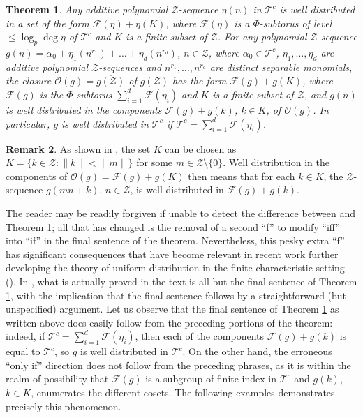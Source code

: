 \documentclass[11pt]{amsart}
\theoremstyle{theorem}
\newtheorem{theorem}{Theorem}[section]
\theoremstyle{definition}
\newtheorem{remark}[theorem]{Remark}
\newcommand{\mZ}{\mathcal{Z}}
\newcommand{\mT}{\mathcal{T}}
\newcommand{\mF}{\mathcal{F}}
\newcommand{\mO}{\mathcal{O}}
\begin{document}
\begin{theorem} \label{thm: corrected main}
	Any additive polynomial $\mZ$-sequence $\eta(n)$ in $\mT^c$ is well distributed in a set of the form $\mF(\eta) + \eta(K)$, where $\mF(\eta)$ is a $\Phi$-subtorus of level $\le \log_p \deg{\eta}$ of $\mT^c$ and $K$ is a finite subset of $\mZ$.
	For any polynomial $\mZ$-sequence $g(n) = \alpha_0 + \eta_1(n^{r_1}) + \ldots + \eta_d(n^{r_d})$, $n \in \mZ$, where $\alpha_0 \in \mT^c$, $\eta_1, \ldots, \eta_d$ are additive polynomial $\mZ$-sequences and $n^{r_1}, \ldots, n^{r_d}$ are distinct separable monomials, the closure $\mO(g) = \overline{g(\mZ)}$ of $g(\mZ)$ has the form $\mF(g) + g(K)$, where $\mF(g)$ is the $\Phi$-subtorus $\sum_{i=1}^d \mF(\eta_i)$ and $K$ is a finite subset of $\mZ$, and $g(n)$ is well distributed in the components $\mF(g) + g(k)$, $k \in K$, of $\mO(g)$.
	In particular, $g$ is well distributed in $\mT^c$ if $\mT^c = \sum_{i=1}^d \mF(\eta_i)$.
\end{theorem}

\begin{remark}
    As shown in \cite[Theorem 8.1]{bl}, the set $K$ can be chosen as $K = \{k \in \mZ : \|k\| < \|m\|\}$ for some $m \in \mZ \setminus \{0\}$.
    Well distribution in the components of $\mO(g) = \mF(g) + g(K)$ then means that for each $k \in K$, the $\mZ$-sequence $g(mn+k)$, $n \in \mZ$, is well distributed in $\mF(g)+g(k)$.
\end{remark}

The reader may be readily forgiven if unable to detect the difference between \cite[Theorem 0.3]{bl} and Theorem \ref{thm: corrected main}; all that has changed is the removal of a second ``f'' to modify ``iff'' into ``if'' in the final sentence of the theorem.
Nevertheless, this pesky extra ``f'' has significant consequences that have become relevant in recent work further developing the theory of uniform distribution in the finite characteristic setting (\cite{a, cgllw}).
In \cite{bl}, what is actually proved in the text is all but the final sentence of Theorem \ref{thm: corrected main}, with the implication that the final sentence follows by a straightforward (but unspecified) argument.
Let us observe that the final sentence of Theorem \ref{thm: corrected main} as written above does easily follow from the preceding portions of the theorem: indeed, if $\mT^c = \sum_{i=1}^d \mF(\eta_i)$, then each of the components $\mF(g) + g(k)$ is equal to $\mT^c$, so $g$ is well distributed in $\mT^c$.
On the other hand, the erroneous ``only if'' direction does not follow from the preceding phrases, as it is within the realm of possibility that $\mF(g)$ is a subgroup of finite index in $\mT^c$ and $g(k)$, $k \in K$, enumerates the different cosets.
The following examples demonstrates precisely this phenomenon.
\end{document}
